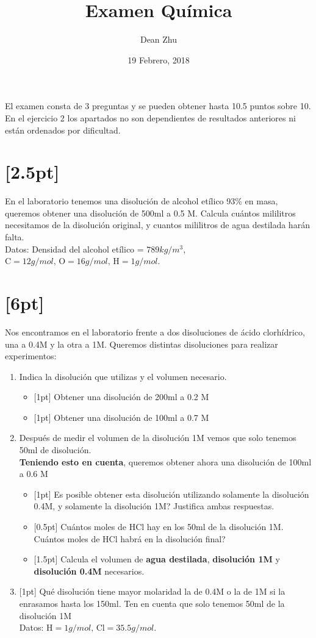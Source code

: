 \documentclass[11pt]{article}
\date{19 Febrero, 2018}
\title{Examen Química}
\author{Dean Zhu}
\begin{document}
\maketitle
\thispagestyle{empty}
El examen consta de 3 preguntas y se pueden obtener hasta 10.5 puntos sobre 10. En el ejercicio 2 los apartados no son dependientes de resultados anteriores ni están ordenados por dificultad. 
\section{[2.5pt]}
\label{sec:org220dcd1}
En el laboratorio tenemos una disolución de alcohol etílico 93\% en masa, queremos obtener una disolución de 500ml a 0.5 M. Calcula cuántos mililitros necesitamos de la disolución original, y cuantos mililitros de agua destilada harán falta. \\
Datos: Densidad del alcohol etílico = \(789kg/m^{3}\), \(\text{C} = 12g/mol \text{, O} = 16g/mol \text{, H} = 1g/mol \).

\section{[6pt]}
\label{sec:org466d254}
Nos encontramos en el laboratorio frente a dos disoluciones de ácido clorhídrico, una a 0.4M y la otra a 1M. Queremos distintas disoluciones para realizar experimentos:
\begin{enumerate}[label=\Alph*)]
\item Indica la disolución que utilizas y el volumen necesario.
    \begin{itemize}
    \item {[1pt]} Obtener una disolución de 200ml a 0.2 M
    \item {[1pt]} Obtener una disolución de 100ml a 0.7 M
    \end{itemize}
  \item Después de medir el volumen de la disolución 1M vemos que solo tenemos 50ml de disolución. \\
    \textbf{Teniendo esto en cuenta}, queremos obtener ahora una disolución de 100ml a 0.6 M
    \begin{itemize}
    \item {[1pt]} Es posible obtener esta disolución utilizando solamente la disolución 0.4M, y solamente la disolución 1M? Justifica ambas respuestas.
    \item {[0.5pt]} Cuántos moles de HCl hay en los 50ml de la disolución 1M. Cuántos moles de HCl habrá en la disolución final?
    \item {[1.5pt]} Calcula el volumen de \textbf{agua destilada}, \textbf{disolución 1M} y \textbf{disolución 0.4M} necesarios.  \\
    \end{itemize}
  \item {[1pt]} Qué disolución tiene mayor molaridad la de 0.4M o la de 1M si la enrasamos hasta los 150ml. Ten en cuenta que solo tenemos 50ml de la disolución 1M \\
      Datos: \(\text{H} = 1g/mol \text{, Cl} = 35.5g/mol \).
  \end{enumerate}
\end{document}
